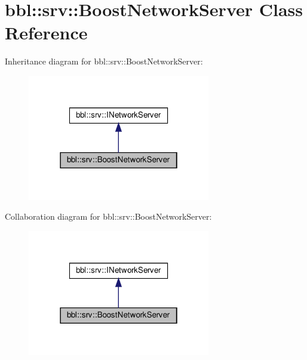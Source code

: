 \hypertarget{classbbl_1_1srv_1_1_boost_network_server}{}\section{bbl\+:\+:srv\+:\+:Boost\+Network\+Server Class Reference}
\label{classbbl_1_1srv_1_1_boost_network_server}


Inheritance diagram for bbl\+:\+:srv\+:\+:Boost\+Network\+Server\+:
\nopagebreak
\begin{figure}[H]
\begin{center}
\leavevmode
\includegraphics[width=226pt]{classbbl_1_1srv_1_1_boost_network_server__inherit__graph}
\end{center}
\end{figure}


Collaboration diagram for bbl\+:\+:srv\+:\+:Boost\+Network\+Server\+:
\nopagebreak
\begin{figure}[H]
\begin{center}
\leavevmode
\includegraphics[width=226pt]{classbbl_1_1srv_1_1_boost_network_server__coll__graph}
\end{center}
\end{figure}
